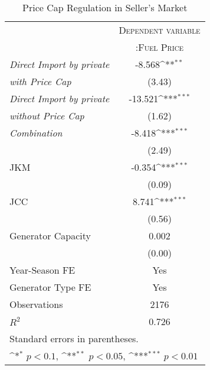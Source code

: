 \documentclass[12pt]{article}
\begin{document}
\begin{table}[htbp]\centering
\def\sym#1{\ifmmode^{#1}\else\(^{#1}\)\fi}
\caption{Price Cap Regulation in Seller's Market\label{tab1}}
\renewcommand{\arraystretch}{0.7}
\begin{tabular}{l*{1}{c}}
\toprule
 & \multicolumn{1}{c}{\textsc{Dependent variable}} \\ 
                     &\multicolumn{1}{c}{\textsc{:Fuel Price}}\\
\hline \hline
\addlinespace
\textit{Direct Import by private} &      -8.568\sym{**} \\
\textit{with Price Cap}                    &      (3.43)         \\
\addlinespace
\textit{Direct Import by private} &     -13.521\sym{***}\\
\textit{without Price Cap}   &      (1.62)         \\
\addlinespace
\textit{Combination}  &      -8.418\sym{***}\\
                    &      (2.49)         \\
\addlinespace
JKM                 &      -0.354\sym{***}\\
                    &      (0.09)         \\
\addlinespace
JCC                 &       8.741\sym{***}\\
                    &      (0.56)         \\
\addlinespace
Generator Capacity          &       0.002         \\
                    &      (0.00)         \\
\midrule
Year-Season FE          &    Yes \\
Generator Type FE        &    Yes \\
Observations                   &    2176         \\
$R^2$                 &       0.726         \\
\bottomrule
\multicolumn{2}{l}{\footnotesize Standard errors in parentheses.}\\
\multicolumn{2}{l}{\footnotesize \sym{*} \(p<0.1\), \sym{**} \(p<0.05\), \sym{***} \(p<0.01\)}\\
\end{tabular}
\end{table}
\end{document}
